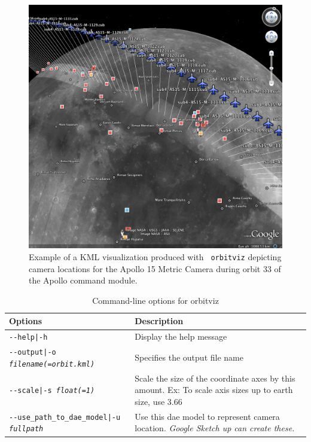 \begin{figure}[!b]
  \begin{center}
  \includegraphics[width=6in]{images/orbitviz_ge_result.png}
  \end{center}
  \caption{ Example of a \ac{KML} visualization produced with {\tt
      orbitviz} depicting camera locations for the Apollo 15 Metric
    Camera during orbit 33 of the Apollo command module.}
  \label{fig:orbitviz_example}
\end{figure}

\begin{longtable}{|l|p{10cm}|}
\caption{Command-line options for orbitviz}
\label{tbl:orbitviz}
\endfirsthead
\endhead
\endfoot
\endlastfoot
\hline
Options & Description \\ \hline \hline
\texttt{-\/-help|-h} & Display the help message\\ \hline
\texttt{-\/-output|-o \textit{filename(=orbit.kml)}} & Specifies the output file name \\ \hline
\texttt{-\/-scale|-s \textit{float(=1)}} & Scale the size of the coordinate axes by this amount. Ex: To scale axis sizes up to earth size, use 3.66 \\ \hline
\texttt{-\/-use\_path\_to\_dae\_model|-u \textit{fullpath}} & Use this dae model to represent camera location. \emph{Google Sketch up can create these.} \\ \hline
\end{longtable}

